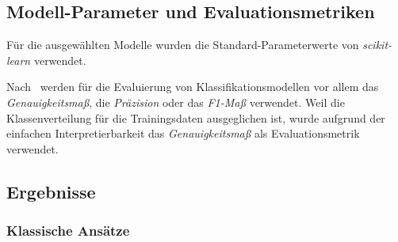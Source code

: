 \subsection{Modell-Parameter und Evaluationsmetriken}

Für die ausgewählten Modelle wurden die Standard-Parameterwerte von \textit{scikit-learn} verwendet.

Nach~\cite{wankhade2022survey} werden für die Evaluierung von Klassifikationsmodellen vor allem das \textit{Genauig\-keits\-maß}, die \textit{Präzision} oder das \textit{F1-Maß} verwendet.
Weil die Klassenverteilung für die Trainingsdaten ausgeglichen ist, wurde aufgrund der einfachen Interpretierbarkeit das \textit{Genauigkeitsmaß} als Evaluationsmetrik verwendet.

\subsection{Ergebnisse}

\subsubsection{Klassische Ansätze}

